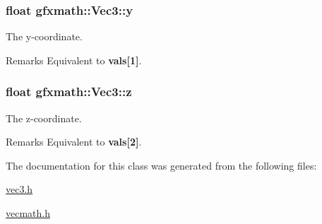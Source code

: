 \subsubsection[{y}]{\setlength{\rightskip}{0pt plus 5cm}float gfxmath\+::\+Vec3\+::y}\label{classgfxmath_1_1_vec3_a398bee406395fdc1ad381f5b70d7fd99}


The y-\/coordinate. 

\begin{DoxyRemark}{Remarks}
Equivalent to {\bfseries vals\mbox{[}1\mbox{]}}. 
\end{DoxyRemark}
\hypertarget{classgfxmath_1_1_vec3_a93c1920712889d4f10520c7dc76a79c7}{}
\subsubsection[{z}]{\setlength{\rightskip}{0pt plus 5cm}float gfxmath\+::\+Vec3\+::z}\label{classgfxmath_1_1_vec3_a93c1920712889d4f10520c7dc76a79c7}


The z-\/coordinate. 

\begin{DoxyRemark}{Remarks}
Equivalent to {\bfseries vals\mbox{[}2\mbox{]}}. 
\end{DoxyRemark}


The documentation for this class was generated from the following files\+:\begin{DoxyCompactItemize}
\item 
\hyperlink{vec3_8h}{vec3.\+h}\item 
\hyperlink{vecmath_8h}{vecmath.\+h}\end{DoxyCompactItemize}
